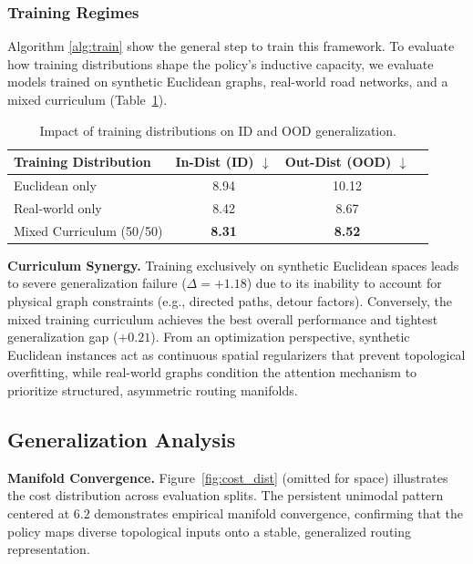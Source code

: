 \documentclass[journal,twoside,web]{ieeecolor}
\theoremstyle{definition}
\theoremstyle{remark}
\theoremstyle{definition}
\begin{document}
\subsubsection{Training Regimes}

Algorithm \ref{alg:train} show the general step to train this framework. To evaluate how training distributions shape the policy's inductive capacity, we evaluate models trained on synthetic Euclidean graphs, real-world road networks, and a mixed curriculum (Table~\ref{tab:generalization}).

\begin{table}[h]
\centering
\caption{Impact of training distributions on ID and OOD generalization.}
\label{tab:generalization}
\begin{tabular}{lccc}
\toprule
\textbf{Training Distribution} & \textbf{In-Dist (ID)} $\downarrow$ & \textbf{Out-Dist (OOD)} $\downarrow$ \\
\midrule
Euclidean only & 8.94 & 10.12 \\
Real-world only & 8.42 & 8.67 \\
Mixed Curriculum (50/50) & \textbf{8.31} & \textbf{8.52} \\
\bottomrule
\end{tabular}
\end{table}

\noindent\textbf{Curriculum Synergy.}
Training exclusively on synthetic Euclidean spaces leads to severe generalization failure ($\Delta = +1.18$) due to its inability to account for physical graph constraints (e.g., directed paths, detour factors). Conversely, the mixed training curriculum achieves the best overall performance and tightest generalization gap ($+0.21$). From an optimization perspective, synthetic Euclidean instances act as continuous spatial regularizers that prevent topological overfitting, while real-world graphs condition the attention mechanism to prioritize structured, asymmetric routing manifolds.

\subsection{Generalization Analysis}
\noindent\textbf{Manifold Convergence.}
Figure~\ref{fig:cost_dist} (omitted for space) illustrates the cost distribution across evaluation splits. The persistent unimodal pattern centered at $6.2$ demonstrates empirical manifold convergence, confirming that the policy maps diverse topological inputs onto a stable, generalized routing representation.
\end{document}
